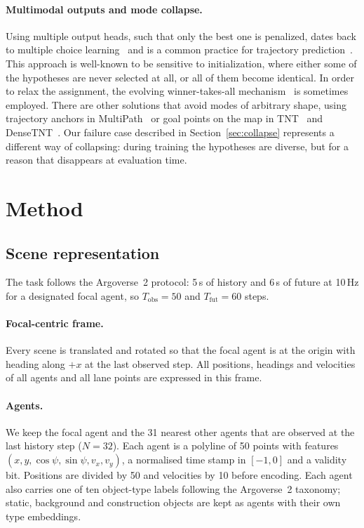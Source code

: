 \documentclass[10pt]{article}
\begin{document}
\paragraph{Multimodal outputs and mode collapse.} Using multiple output heads, such that only
the best one is penalized, dates back to multiple choice learning~\cite{guzman2012mcl} and is
a common practice for trajectory prediction~\cite{cui2019mtp}. This approach is well-known to
be sensitive to initialization, where either some of the hypotheses are never selected at
all, or all of them become identical. In order to relax the assignment, the evolving
winner-takes-all mechanism~\cite{makansi2019ewta} is sometimes employed. There are other
solutions that avoid modes of arbitrary shape, using trajectory anchors in
MultiPath~\cite{chai2019multipath} or goal points on the map in TNT~\cite{zhao2020tnt} and
DenseTNT~\cite{gu2021densetnt}. Our failure case described in Section~\ref{sec:collapse}
represents a different way of collapsing: during training the hypotheses are diverse, but for
a reason that disappears at evaluation time.

\section{Method}
\label{sec:method}

\subsection{Scene representation}

The task follows the Argoverse~2 protocol: 5\,s of history and 6\,s of future at 10\,Hz for a
designated focal agent, so $T_\text{obs}=50$ and $T_\text{fut}=60$ steps.

\paragraph{Focal-centric frame.} Every scene is translated and rotated so that the focal agent
is at the origin with heading along $+x$ at the last observed step. All positions, headings
and velocities of all agents and all lane points are expressed in this frame.

\paragraph{Agents.} We keep the focal agent and the 31 nearest other agents that are observed
at the last history step ($N=32$). Each agent is a polyline of 50 points with features
$(x, y, \cos\psi, \sin\psi, v_x, v_y)$, a normalised time stamp in $[-1, 0]$ and a validity
bit. Positions are divided by 50 and velocities by 10 before encoding. Each agent also
carries one of ten object-type labels following the Argoverse~2 taxonomy; static, background
and construction objects are kept as agents with their own type embeddings.
\end{document}
